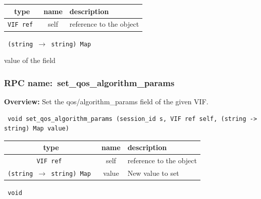
 
\vspace{0.3cm}
\begin{tabular}{|c|c|p{7cm}|}
 \hline
{\bf type} & {\bf name} & {\bf description} \\ \hline
{\tt VIF ref } & self & reference to the object \\ \hline 

\end{tabular}

\vspace{0.3cm}

{\tt 
(string $\rightarrow$ string) Map
}


value of the field
\vspace{0.3cm}
\vspace{0.3cm}
\vspace{0.3cm}
\subsubsection{RPC name:~set\_qos\_algorithm\_params}

{\bf Overview:} 
Set the qos/algorithm\_params field of the given VIF.

\begin{verbatim} void set_qos_algorithm_params (session_id s, VIF ref self, (string -> string) Map value)\end{verbatim}



 
\vspace{0.3cm}
\begin{tabular}{|c|c|p{7cm}|}
 \hline
{\bf type} & {\bf name} & {\bf description} \\ \hline
{\tt VIF ref } & self & reference to the object \\ \hline 

{\tt (string $\rightarrow$ string) Map } & value & New value to set \\ \hline 

\end{tabular}

\vspace{0.3cm}

{\tt 
void
}



\vspace{0.3cm}
\vspace{0.3cm}
\vspace{0.3cm}
